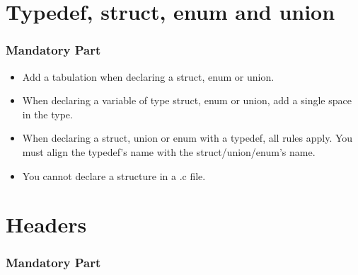 \documentclass{42-en}
\begin{document}
    \section{Typedef, struct, enum and union}

        \subsubsection{Mandatory Part}

            \begin{itemize}

                \item Add a tabulation when declaring a struct, enum or union.

                \item When declaring a variable of type struct, enum or union,
                  add a single space in the type.

      			\item When declaring a struct, union or enum with a typedef,
                        all rules apply. You must align the typedef's name
                        with the struct/union/enum's name.

      			\item You cannot declare a structure in a .c file.

            \end{itemize}


    \section{Headers}

        \subsubsection{Mandatory Part}
\end{document}
